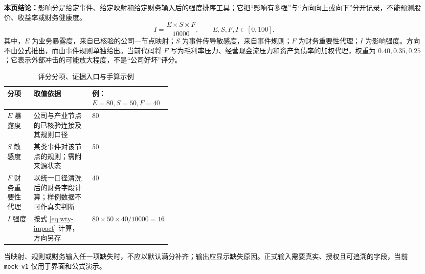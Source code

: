 \textbf{本页结论：}影响分是给定事件、给定映射和给定财务输入后的强度排序工具；它把“影响有多强”与“方向向上或向下”分开记录，不能预测股价、收益率或财务健康度。
\begin{equation}
I=\frac{E\times S\times F}{10000},\qquad E,S,F,I\in[0,100].\label{eq:wty-impact}
\end{equation}
其中，$E$ 为业务暴露度，来自已核验的公司—节点映射；$S$ 为事件传导敏感度，来自事件规则；$F$ 为财务重要性代理；$I$ 为影响强度。方向不由公式推出，而由事件规则单独给出。当前代码将 $F$ 写为毛利率压力、经营现金流压力和资产负债率的加权代理，权重为 $0.40,0.35,0.25$\cite{wty-repo-scoring}；它表示外部冲击的可能放大程度，不是“公司好坏”评分。

\begin{table}[htbp]
\centering
\caption{评分分项、证据入口与手算示例}
\label{tab:wty-impact-score}
\small
\begin{tabularx}{\linewidth}{p{0.16\linewidth}X p{0.23\linewidth}}
\toprule
分项 & 取值依据 & 例：$E=80,S=50,F=40$ \\
\midrule
$E$ 暴露度 & 公司与产业节点的已核验连接及其规则口径 & 80 \\
$S$ 敏感度 & 某类事件对该节点的规则；需附来源状态 & 50 \\
$F$ 财务重要性代理 & 以统一口径清洗后的财务字段计算；样例数据不可作真实判断 & 40 \\
$I$ 强度 & 按式 \ref{eq:wty-impact} 计算，方向另存 & $80\times50\times40/10000=16$ \\
\bottomrule
\end{tabularx}
\end{table}

当映射、规则或财务输入任一项缺失时，不应以默认满分补齐；输出应显示缺失原因。正式输入需要真实、授权且可追溯的字段，当前 \texttt{mock-v1} 仅用于界面和公式演示。
